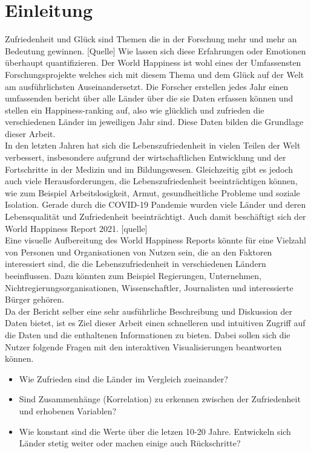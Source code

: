 \section{Einleitung}

Zufriedenheit und Glück sind Themen die in der Forschung mehr und mehr an Bedeutung gewinnen. [Quelle]
Wie lassen sich diese Erfahrungen oder Emotionen überhaupt quantifizieren. Der World Happiness ist wohl eines der Umfassensten Forschungsprojekte welches sich mit diesem Thema und dem Glück auf der Welt am ausführlichsten Auseinandersetzt. Die Forscher erstellen jedes Jahr einen umfassenden bericht über alle Länder über die sie Daten erfassen können und stellen ein Happiness-ranking auf, also wie glücklich und zufrieden die verschiedenen Länder im jeweiligen Jahr sind. Diese Daten bilden die Grundlage dieser Arbeit. \\

In den letzten Jahren hat sich die Lebenszufriedenheit in vielen Teilen der Welt verbessert, insbesondere aufgrund der wirtschaftlichen Entwicklung und der Fortschritte in der Medizin und im Bildungswesen. Gleichzeitig gibt es jedoch auch viele Herausforderungen, die Lebenszufriedenheit beeinträchtigen können, wie zum Beispiel Arbeitslosigkeit, Armut, gesundheitliche Probleme und soziale Isolation. Gerade durch die COVID-19 Pandemie wurden viele Länder und deren Lebensqualität und Zufriedenheit beeinträchtigt. Auch damit beschäftigt sich der World Happiness Report 2021.  [quelle] \\

Eine visuelle Aufbereitung des World Happiness Reports könnte für eine Vielzahl von Personen und Organisationen von Nutzen sein, die an den Faktoren interessiert sind, die die Lebenszufriedenheit in verschiedenen Ländern beeinflussen. Dazu könnten zum Beispiel Regierungen, Unternehmen, Nichtregierungsorganisationen, Wissenschaftler, Journalisten und interessierte Bürger gehören. \\

Da der Bericht selber eine sehr ausführliche Beschreibung und Diskussion der Daten bietet, ist es Ziel dieser Arbeit einen schnelleren und intuitiven Zugriff auf die Daten und die enthaltenen Informationen zu bieten. Dabei sollen sich die Nutzer folgende Fragen mit den interaktiven Visualisierungen beantworten können. \\

\begin{itemize}
    \item Wie Zufrieden sind die Länder im Vergleich zueinander?
    \item Sind Zusammenhänge (Korrelation) zu erkennen zwischen der Zufriedenheit und erhobenen Variablen?
    \item Wie konstant sind die Werte über die letzen 10-20 Jahre. Entwickeln sich Länder stetig weiter oder machen einige auch Rückschritte?
\end{itemize}

